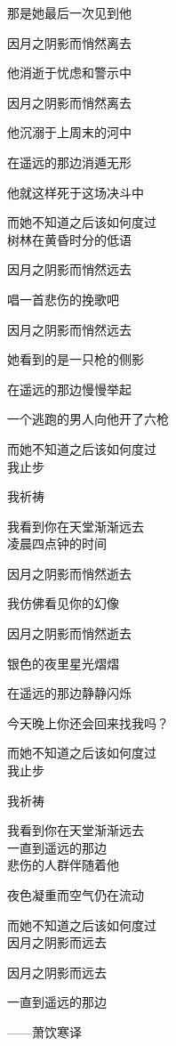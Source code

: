 {
那是她最后一次见到他

因月之阴影而悄然离去

他消逝于忧虑和警示中

因月之阴影而悄然离去

他沉溺于上周末的河中

在遥远的那边消遁无形

他就这样死于这场决斗中

而她不知道之后该如何度过\\


树林在黄昏时分的低语

因月之阴影而悄然远去

唱一首悲伤的挽歌吧

因月之阴影而悄然远去

她看到的是一只枪的侧影

在遥远的那边慢慢举起

一个逃跑的男人向他开了六枪

而她不知道之后该如何度过\\



我止步

我祈祷

我看到你在天堂渐渐远去\\


凌晨四点钟的时间

因月之阴影而悄然逝去

我仿佛看见你的幻像

因月之阴影而悄然逝去

银色的夜里星光熠熠

在遥远的那边静静闪烁

今天晚上你还会回来找我吗？

而她不知道之后该如何度过\\


我止步

我祈祷

我看到你在天堂渐渐远去\\


一直到遥远的那边\\


悲伤的人群伴随着他

夜色凝重而空气仍在流动

而她不知道之后该如何度过\\


因月之阴影而远去

因月之阴影而远去

一直到遥远的那边 
\begin{flushright}
	——萧饮寒译
\end{flushright}
}
